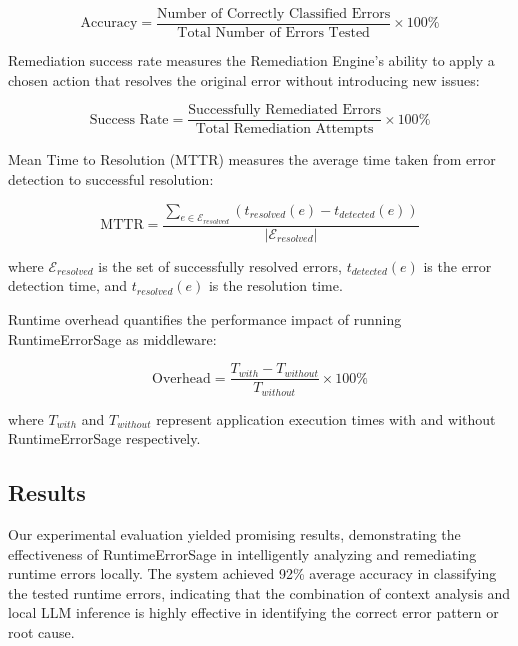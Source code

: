 \begin{equation}
\label{eq:accuracy}
\text{Accuracy} = \frac{\text{Number of Correctly Classified Errors}}{\text{Total Number of Errors Tested}} \times 100\%
\end{equation}

Remediation success rate measures the Remediation Engine's ability to apply a chosen action that resolves the original error without introducing new issues:

\begin{equation}
\label{eq:success_rate}
\text{Success Rate} = \frac{\text{Successfully Remediated Errors}}{\text{Total Remediation Attempts}} \times 100\%
\end{equation}

Mean Time to Resolution (MTTR) measures the average time taken from error detection to successful resolution:

\begin{equation}
\label{eq:mttr}
\text{MTTR} = \frac{\sum_{e \in \mathcal{E}_{resolved}} (t_{resolved}(e) - t_{detected}(e))}{|\mathcal{E}_{resolved}|}
\end{equation}

where $\mathcal{E}_{resolved}$ is the set of successfully resolved errors, $t_{detected}(e)$ is the error detection time, and $t_{resolved}(e)$ is the resolution time.

Runtime overhead quantifies the performance impact of running RuntimeErrorSage as middleware:

\begin{equation}
\label{eq:overhead}
\text{Overhead} = \frac{T_{with} - T_{without}}{T_{without}} \times 100\%
\end{equation}

where $T_{with}$ and $T_{without}$ represent application execution times with and without RuntimeErrorSage respectively.

\subsection{Results}
Our experimental evaluation yielded promising results, demonstrating the effectiveness of RuntimeErrorSage in intelligently analyzing and remediating runtime errors locally. The system achieved 92\% average accuracy in classifying the tested runtime errors, indicating that the combination of context analysis and local LLM inference is highly effective in identifying the correct error pattern or root cause.

